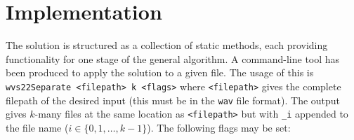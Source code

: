\documentclass[12pt,a4paper,twoside,openright]{report}
\begin{document}



\chapter{Implementation}

The solution is structured as a collection of static methods, each providing functionality for one stage of the general algorithm. A command-line tool has been produced to apply the solution to a given file. The usage of this is \texttt{wvs22Separate <filepath> k <flags>} where \texttt{<filepath>} gives the complete filepath of the desired input (this must be in the \texttt{wav} file format). The output gives $ k $-many files at the same location as \texttt{<filepath>} but with \texttt{\_i} appended to the file name ($ i \in \{0, 1, \ldots, k-1\} $). The following flags may be set:

\bigskip

\end{document}
